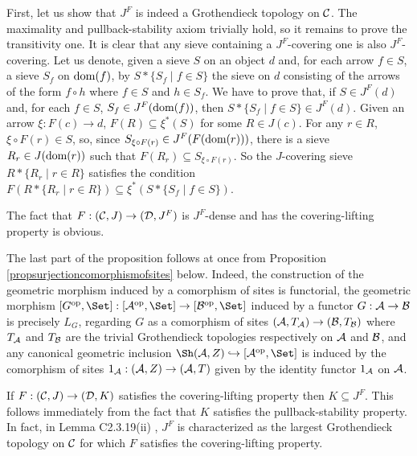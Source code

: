 \documentclass[a4paper,12pt]{article}
\begin{document}
\begin{proofs}
First, let us show that $J^{F}$ is indeed a Grothendieck topology on $\cal C$. The maximality and pullback-stability axiom trivially hold, so it remains to prove the transitivity one. It is clear that any sieve containing a $J^{F}$-covering one is also $J^{F}$-covering. Let us denote, given a sieve $S$ on an object $d$ and, for each arrow $f\in S$, a sieve $S_{f}$ on $\textup{dom}(f)$, by $S\ast \{S_{f} \mid f\in S\}$ the sieve on $d$ consisting of the arrows of the form $f\circ h$ where $f\in S$ and $h\in S_{f}$. We have to prove that, if $S\in J^{F}(d)$ and, for each $f\in S$, $S_{f}\in J^{F}(\textup{dom}(f))$, then $S\ast \{S_{f} \mid f\in S\}\in J^{F}(d)$. Given an arrow $\xi:F(c)\to d$, $F(R) \subseteq \xi^{\ast}(S)$ for some $R\in J(c)$. For any $r\in R$, $\xi \circ F(r)\in S$, so, since $S_{\xi \circ F(r)}\in J^{F}(F(\textup{dom}(r)))$, there is a sieve $R_{r}\in J(\textup{dom}(r))$ such that $F(R_{r})\subseteq S_{\xi \circ F(r)}$. So the $J$-covering sieve $R\ast \{R_{r}\mid r\in R \}$ satisfies the condition $F(R\ast \{R_{r}\mid r\in R \})\subseteq \xi^{\ast}(S\ast \{S_{f} \mid f\in S\})$.

The fact that $F:({\cal C}, J)\to ({\cal D}, J^{F})$ is $J^{F}$-dense and has the covering-lifting property is obvious.

The last part of the proposition follows at once from Proposition \ref{propsurjectioncomorphismofsites} below. Indeed, the construction of the geometric morphism induced by a comorphism of sites is functorial, the geometric morphism $[G^{\textup{op}}, \Set]:[{\cal A}^{\textup{op}}, \Set] \to [{\cal B}^{\textup{op}}, \Set]$ induced by a functor $G:{\cal A}\to {\cal B}$ is precisely $L_{G}$, regarding $G$ as a comorphism of sites $({\cal A}, T_{\cal A})\to ({\cal B}, T_{\cal B})$ where $T_{\cal A}$ and $T_{\cal B}$ are the trivial Grothendieck topologies respectively on $\cal A$ and $\cal B$, and any canonical geometric inclusion $\Sh({\cal A}, Z) \hookrightarrow [{\cal A}^{\textup{op}}, \Set]$ is induced by the comorphism of sites $1_{\cal A}:({\cal A}, Z) \to ({\cal A}, T)$ given by the identity functor $1_{\cal A}$ on $\cal A$. 
\end{proofs}

\begin{remark}\label{remcovlift}
If $F:({\cal C}, J)\to ({\cal D}, K)$ satisfies the covering-lifting property then $K\subseteq J^{F}$. This follows immediately from the fact that $K$ satisfies the pullback-stability property. In fact, in Lemma C2.3.19(ii) \cite{El}, $J^{F}$ is characterized as the largest Grothendieck topology on $\cal C$ for which $F$ satisfies the covering-lifting property.    	
\end{remark}
	
\end{document}
